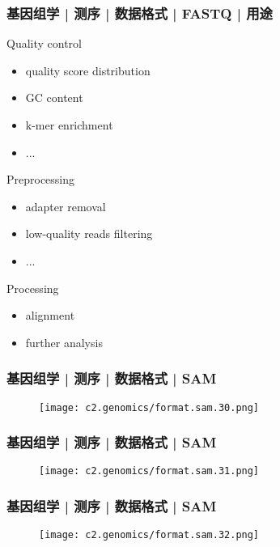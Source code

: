 \begin{frame}
  \frametitle{基因组学 | 测序 | 数据格式 | FASTQ | 用途}
  \begin{block}{Quality control}
    \begin{itemize}
      \item quality score distribution
      \item GC content
      \item k-mer enrichment
      \item ...
    \end{itemize}
  \end{block}
  \pause
  \begin{block}{Preprocessing}
    \begin{itemize}
      \item adapter removal
      \item low-quality reads filtering
      \item ...
    \end{itemize}
  \end{block}
  \pause
  \begin{block}{Processing}
    \begin{itemize}
      \item alignment
      \item further analysis
    \end{itemize}
  \end{block}
\end{frame}

\begin{frame}
  \frametitle{基因组学 | 测序 | 数据格式 | SAM}
  \begin{figure}
    \centering
    \texttt{[image: c2.genomics/format.sam.30.png]}
  \end{figure}
\end{frame}

\begin{frame}
  \frametitle{基因组学 | 测序 | 数据格式 | SAM}
  \begin{figure}
    \centering
    \texttt{[image: c2.genomics/format.sam.31.png]}
  \end{figure}
\end{frame}

\begin{frame}
  \frametitle{基因组学 | 测序 | 数据格式 | SAM}
  \begin{figure}
    \centering
    \texttt{[image: c2.genomics/format.sam.32.png]}
  \end{figure}
\end{frame}

